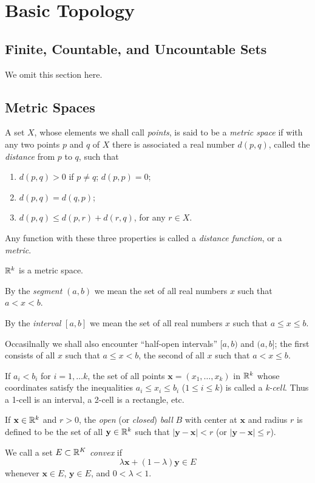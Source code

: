 \section{Basic Topology}
\subsection{Finite, Countable, and Uncountable Sets}
We omit this section here.
\subsection{Metric Spaces}
\begin{definition}
A set $X$, whose elements we shall call \emph{points}, is said to be a \emph{metric space} if with any two points $p$ and $q$ of $X$ there is associated a real number $d(p,q)$, called the \emph{distance} from $p$ to $q$, such that
\begin{enumerate}
    \item[(a)] $d(p,q)>0$ if $p \neq q$; $d(p,p)=0$;
    \item[(b)] $d(p,q)=d(q,p)$;
    \item[(c)] $d(p,q) \leq d(p,r)+d(r,q)$, for any $r \in X$.  
\end{enumerate}

Any function with these three properties is called a \emph{distance function}, or a \emph{metric}.
\end{definition}
\begin{example}
$\mathbb{R}^k$ is a metric space.
\end{example}
\begin{definition}
By the \emph{segment} $(a,b)$ we mean the set of all real numbers $x$ such that $a<x<b$.

By the \emph{interval} $[a,b]$ we mean the set of all real numbers $x$ such that $a \leq x \leq b$.

Occasilnally we shall also encounter ``half-open intervals'' $[a,b)$ and $(a,b]$; the first consists of all $x$ such that $a \leq x < b$, the second of all $x$ such that $a < x \leq b$.

If $a_i<b_i$ for $i=1, \ldots k$, the set of all points $\mathbf{x}=(x_1, \dots , x_k)$ in $\mathbb{R}^k$ whose coordinates satisfy the inequalities $a_i \leq x_i \leq b_i$ ($1 \leq i \leq k$) is called a \emph{k-cell}.
Thus a 1-cell is an interval, a 2-cell is a rectangle, etc.

If $\mathbf{x} \in \mathbb{R}^k$ and $r>0$, the \emph{open} (or \emph{closed}) \emph{ball} $B$ with center at $\mathbf{x}$ and radius $r$ is defined to be the set of all $\mathbf{y} \in \mathbb{R}^k$ such that $|\mathbf{y}-\mathbf{x}|<r$ (or $|\mathbf{y}-\mathbf{x}| \leq r$).

We call a set $E \subset \mathbb{R}^K$ \emph{convex} if
\[
\lambda\mathbf{x}+(1-\lambda)\mathbf{y} \in E
\]
whenever $\mathbf{x} \in E$, $\mathbf{y} \in E$, and $0<\lambda<1$.
\end{definition}
